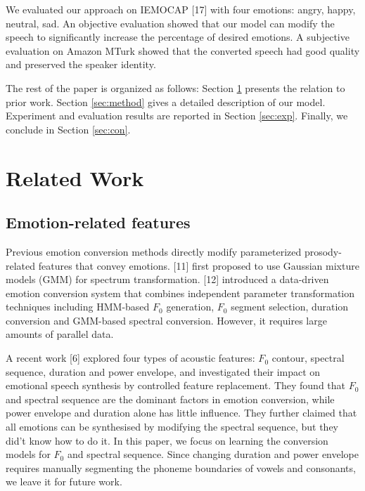 \documentclass{article}
\begin{document}

We evaluated our approach on IEMOCAP [17] with four emotions: angry, happy, neutral, sad.
An objective evaluation showed that our model can modify the speech to significantly increase the percentage of desired emotions. A subjective evaluation on Amazon MTurk showed that the converted speech had good quality and preserved the speaker identity.

The rest of the paper is organized as follows: Section \ref{sec:related} presents the relation to prior work. Section \ref{sec:method} gives a detailed description of our model. Experiment and evaluation results are reported in Section \ref{sec:exp}. Finally, we conclude in Section \ref{sec:con}.


\section{Related Work}
\label{sec:related}

\subsection{Emotion-related features}
Previous emotion conversion methods directly modify parameterized prosody-related features that convey emotions. [11] first proposed to use Gaussian mixture models (GMM) for spectrum transformation. [12] introduced a data-driven emotion conversion system that combines independent parameter transformation techniques including HMM-based $F_0$ generation, $F_0$ segment selection, duration conversion and GMM-based spectral conversion. However, it requires large amounts of parallel data.

A recent work [6] explored four types of acoustic features: $F_0$ contour, spectral sequence, duration and power envelope, and investigated their impact on emotional speech synthesis by controlled feature replacement. They found that $F_0$ and spectral sequence are the dominant factors in emotion conversion, while power envelope and duration alone has little influence. They further claimed that all emotions can be synthesised by modifying the spectral sequence, but they did't know how to do it. In this paper, we focus on learning the conversion models for $F_0$ and spectral sequence. Since changing duration and power envelope requires manually segmenting the phoneme boundaries of vowels and consonants, we leave it for future work.
\end{document}
